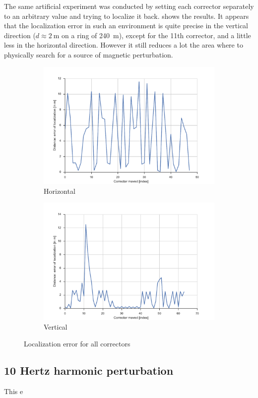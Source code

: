 The same artificial experiment was conducted by setting each corrector separately to an arbitrary value and trying to localize it back.  shows the results. It appears that the localization error in such an environment is quite precise in the vertical direction ($d \approx \SI{2}{\meter}$ on a ring of \SI{240}{\meter}), except for the 11th corrector, and a little less in the horizontal direction. However it still reduces a lot the area where to physically search for a source of magnetic perturbation.

\begin{figure}
    \centering
        \begin{subfigure}[b]{0.6\textwidth}
            \includegraphics[width=\linewidth]{img/loc_all_x}
            \caption{Horizontal}
        \end{subfigure}
        \begin{subfigure}[b]{0.6\textwidth}
            \includegraphics[width=\linewidth]{img/loc_all_y}
            \caption{Vertical}
        \end{subfigure}

    \caption{\label{fig:loc_all_corr} Localization error for all correctors}
\end{figure}

\subsection{10 Hertz harmonic perturbation}
This e